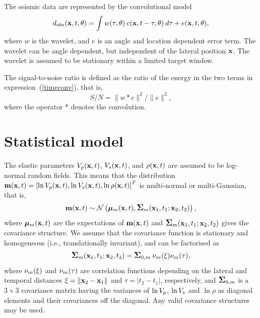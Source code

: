 The seismic data are represented by the convolutional model
%
\begin{equation} \label{timeconv}
   d_{obs}(\mathbf{x},t,\theta)
    =\int w(\tau,\theta) \: c(\mathbf{x},t-\tau,\theta) \: d\tau + e(\mathbf{x},t,\theta),
\end{equation}
%
where $w$ is the wavelet, and $e$ is an angle and location dependent
error term. The wavelet can be angle dependent, but independent of the
lateral position $\mathbf{x}$. The wavelet is assumed to be stationary
within a limited target window.

The signal-to-noise ratio is defined as the ratio of the energy in the
two terms in expression~(\ref{timeconv}), that is,
%
\begin{equation} \label{SNR}
   S/N =  \| w * c\|^2 / \| e\|^2,
\end{equation}
%
\noindent
where the operator * denotes the convolution.

\section{Statistical model}
\label{sec:statmodthe}
The elastic parameters $V_p(\mathbf{x},t)$, $V_s(\mathbf{x},t)$, and
$\rho(\mathbf{x},t)$ are assumed to be log-normal random
fields. This means that the distribution $\mathbf{m}(\mathbf{x},t) =
\left[\ln V_p(\mathbf{x},t),\ln V_s(\mathbf{x},t),\ln\rho(\mathbf{x},t)\right]^T$
is multi-normal or multi-Gaussian, that is,
%
\begin{equation}
  \mathbf{m}(\mathbf{x},t) \sim
  \mathcal{N}\left(\bm\mu_m(\mathbf{x},t),\mbox{\large\ensuremath{\boldsymbol{\Sigma}}}_m(\mathbf{x}_1,t_1;\mathbf{x}_2,t_2)\right),
\label{mdist}
\end{equation}
%
where $\bm\mu_m(\mathbf{x},t)$ are the expectations of
$\mathbf{m}(\mathbf{x},t)$ and $\mbox{\large\ensuremath{\boldsymbol{\Sigma}}}_m(\mathbf{x}_1,t_1;\mathbf{x}_2,t_2)$
gives the covariance structure. We assume that the covariance function
is stationary and homogeneous (i.e., translationally invariant), and
can be factorised as
%
\begin{equation}
  \mbox{\large\ensuremath{\boldsymbol{\Sigma}}}_m(\mathbf{x}_1,t_1;\mathbf{x}_2,t_2)
    = \mbox{\large\ensuremath{\boldsymbol{\Sigma}}}_{0,m} \: \nu_m(\xi) \nu_m(\tau), \label{sigma_m}
\end{equation}
where $\nu_m(\xi)$ and $\nu_m(\tau)$ are correlation functions
depending on the lateral and temporal distances
$\xi = \|\mathbf{x}_2 - \mathbf{x}_1\|$ and $\tau=|t_2-t_1|$,
respectively, and $\mbox{\large\ensuremath{\boldsymbol{\Sigma}}}_{0,m}$ is a $3\times 3$ covariance matrix
having the variances of $\ln V_p$, $\ln V_s$ and $\ln\rho$  as diagonal
elements and their covariances off the diagonal. Any valid covariance
structures may be used.

